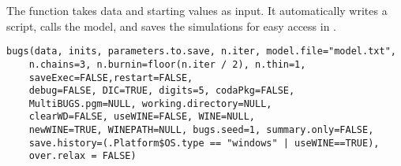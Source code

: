 %
\begin{Description}\relax
The  function takes data and starting values as
input.  It automatically writes a  script, calls the model, and
saves the simulations for easy access in \R{}.
\end{Description}
%
\begin{Usage}
\begin{verbatim}
bugs(data, inits, parameters.to.save, n.iter, model.file="model.txt",
    n.chains=3, n.burnin=floor(n.iter / 2), n.thin=1,
    saveExec=FALSE,restart=FALSE,
    debug=FALSE, DIC=TRUE, digits=5, codaPkg=FALSE,
    MultiBUGS.pgm=NULL, working.directory=NULL,
    clearWD=FALSE, useWINE=FALSE, WINE=NULL,
    newWINE=TRUE, WINEPATH=NULL, bugs.seed=1, summary.only=FALSE,
    save.history=(.Platform$OS.type == "windows" | useWINE==TRUE),
    over.relax = FALSE)
\end{verbatim}
\end{Usage}
%
